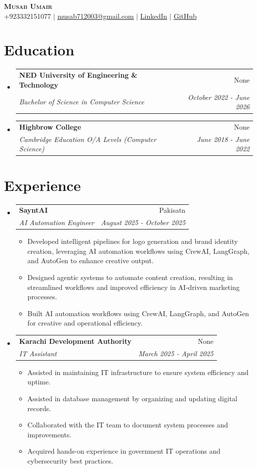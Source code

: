 \documentclass[letterpaper,11pt]{article}
\makeatletter
\newcommand{\resumeItem}[1]{
  \item\small{
    {#1 \vspace{-2pt}}
  }
}
\newcommand{\resumeSubheading}[4]{
  \vspace{-2pt}\item
    \begin{tabular*}{0.97\textwidth}[t]{l@{\extracolsep{\fill}}r}
      \textbf{#1} & #2 \\
      \textit{\small#3} & \textit{\small #4} \\
    \end{tabular*}\vspace{-7pt}
}
\newcommand{\resumeSubHeadingListStart}{\begin{itemize}[leftmargin=0.15in, label={}]}
\newcommand{\resumeSubHeadingListEnd}{\end{itemize}}
\newcommand{\resumeItemListStart}{\begin{itemize}}
\newcommand{\resumeItemListEnd}{\end{itemize}\vspace{-5pt}}
\makeatother
\begin{document}
\begin{center}
    \textbf{\Huge \scshape Musab Umair} \\ \vspace{1pt}
    \small +923332151077 $|$ \href{mailto:musab712003@gmail.com}{\underline{musab712003@gmail.com}} $|$ 
    \href{https://www.linkedin.com/in/musab-umair1}{\underline{LinkedIn}} $|$
    \href{https://github.com/Musab712}{\underline{GitHub}}
\end{center}


\section{Education}
  \resumeSubHeadingListStart
        \resumeSubheading
      {NED University of Engineering \& Technology}{None}
      {Bachelor of Science in Computer Science}{October 2022 - June 2026}
        \resumeSubheading
      {Highbrow College}{None}
      {Cambridge Education O/A Levels (Computer Science)}{June 2018 - June 2022}
      \resumeSubHeadingListEnd


\section{Experience}
  \resumeSubHeadingListStart
        \resumeSubheading
      {SayntAI}{Pakisatn}
      {AI Automation Engineer}{August 2025 - October 2025}
      \resumeItemListStart
                \resumeItem{Developed intelligent pipelines for logo generation and brand identity creation, leveraging AI automation workflows using CrewAI, LangGraph, and AutoGen to enhance creative output.}
                \resumeItem{Designed agentic systems to automate content creation, resulting in streamlined workflows and improved efficiency in AI-driven marketing processes.}
                \resumeItem{Built AI automation workflows using CrewAI, LangGraph, and AutoGen for creative and operational efficiency.}
              \resumeItemListEnd
        \resumeSubheading
      {Karachi Development Authority}{None}
      {IT Assistant}{March 2025 - April 2025}
      \resumeItemListStart
                \resumeItem{Assisted in maintaining IT infrastructure to ensure system efficiency and uptime.}
                \resumeItem{Assisted in database management by organizing and updating digital records.}
                \resumeItem{Collaborated with the IT team to document system processes and improvements.}
                \resumeItem{Acquired hands-on experience in government IT operations and cybersecurity best practices.}
              \resumeItemListEnd
      \resumeSubHeadingListEnd
\end{document}
